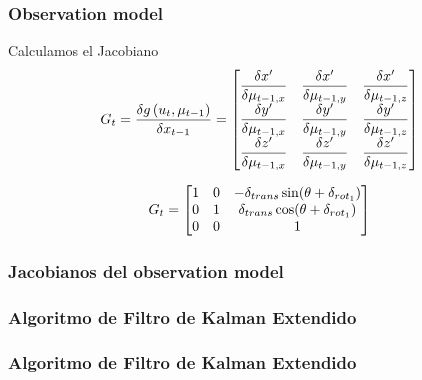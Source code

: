 \begin{frame}
	\frametitle{Observation model}
		Calculamos el Jacobiano
	\begin{equation*}
		G_{t} = \dfrac{\delta g\left( u_{t},\mu_{t-1} \right)}{\delta x_{t-1}} =
		\begin{bmatrix}
			\dfrac{\delta x^{\prime}}{\delta \mu_{t-1,x}} & \dfrac{\delta x^{\prime}}{\delta \mu_{t-1,y}} & \dfrac{\delta x^{\prime}}{\delta \mu_{t-1,z}}\\
			\dfrac{\delta y^{\prime}}{\delta \mu_{t-1,x}} & \dfrac{\delta y^{\prime}}{\delta \mu_{t-1,y}} & \dfrac{\delta y^{\prime}}{\delta \mu_{t-1,z}}\\
			\dfrac{\delta z^{\prime}}{\delta \mu_{t-1,x}} & \dfrac{\delta z^{\prime}}{\delta \mu_{t-1,y}} & \dfrac{\delta z^{\prime}}{\delta \mu_{t-1,z}}\\
		\end{bmatrix}
	\end{equation*}
	
	\begin{equation*}
		G_{t} = 
		\begin{bmatrix}
			1 & 0 & -\delta_{trans} \sin(\theta + \delta_{rot_{1}})\\
			0 & 1 & \delta_{trans} \cos(\theta + \delta_{rot_{1}})\\
			0 & 0 & 1\\
		\end{bmatrix}
	\end{equation*}
	
\end{frame}

\begin{frame}
	\frametitle{Jacobianos del observation model}
	
	
\end{frame}

\begin{frame}
	\frametitle{Algoritmo de Filtro de Kalman Extendido}
	
	
\end{frame}

\begin{frame}
	\frametitle{Algoritmo de Filtro de Kalman Extendido}
	
	
\end{frame}

